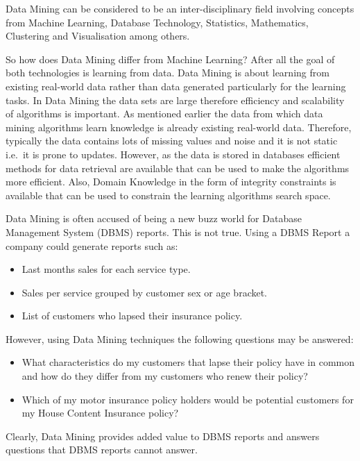 \documentclass[a4paper,12pt,notitlepage,pdftex]{scrreprt}
\begin{document}
    Data Mining can be considered to be an inter-disciplinary field involving concepts from Machine Learning, Database
    Technology, Statistics, Mathematics, Clustering and Visualisation among others.

    So how does Data Mining differ from Machine Learning?
    After all the goal of both technologies is learning from data.
    Data Mining is about learning from existing real-world data rather than data generated particularly for the
    learning tasks.
    In Data Mining the data sets are large therefore efficiency and scalability of algorithms is important.
    As mentioned earlier the data from which data mining algorithms learn knowledge is already existing real-world
    data.
    Therefore, typically the data contains lots of missing values and noise and it is not static i.e.\ it is prone to
    updates.
    However, as the data is stored in databases efficient methods for data retrieval are available that can be used to
    make the algorithms more efficient.
    Also, Domain Knowledge in the form of integrity constraints is available that can be used to constrain the
    learning algorithms search space.

    Data Mining is often accused of being a new buzz world for Database Management System (DBMS) reports.
    This is not true.
    Using a DBMS Report a company could generate reports such as:
    \begin{itemize}
        \item Last months sales for each service type.
        \item Sales per service grouped by customer sex or age bracket.
        \item List of customers who lapsed their insurance policy.
    \end{itemize}

    However, using Data Mining techniques the following questions may be answered:
    \begin{itemize}
        \item What characteristics do my customers that lapse their policy have in common and how do they differ from
            my customers who renew their policy?
        \item Which of my motor insurance policy holders would be potential customers for my House Content Insurance
            policy?
    \end{itemize}

    Clearly, Data Mining provides added value to DBMS reports and answers questions that DBMS reports cannot answer.
\end{document}
